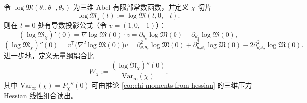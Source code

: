 \begin{corollary}\label{cor:chi-slice-logm-derivatives-and-W}
令 \(\log\mathfrak{M}(\theta_e,\theta_-,\theta_2)\) 为三维 Abel 有限部常数函数，并定义 \(\chi\) 切片
$$
\log\mathfrak{M}_\chi(t):=\log\mathfrak{M}(t,0,-t).
$$
则在 \(t=0\) 处有导数投影公式（令 \(v=(1,0,-1)\)）：
$$
(\log\mathfrak{M}_\chi)'(0)
=\nabla\log\mathfrak{M}(0)\cdot v
=\partial_{\theta_e}\log\mathfrak{M}(0)-\partial_{\theta_2}\log\mathfrak{M}(0),
$$
$$
(\log\mathfrak{M}_\chi)''(0)
=v^{\mathsf T}\bigl(\nabla^2\log\mathfrak{M}(0)\bigr)v
=\partial_{\theta_e\theta_e}^2\log\mathfrak{M}(0)+\partial_{\theta_2\theta_2}^2\log\mathfrak{M}(0)-2\partial_{\theta_e\theta_2}^2\log\mathfrak{M}(0).
$$
进一步地，定义无量纲耦合比
$$
W_\chi:=\frac{(\log\mathfrak{M}_\chi)''(0)}{\mathrm{Var}_\infty(\chi)}.
$$
其中 \(\mathrm{Var}_\infty(\chi)=P_\chi''(0)\) 可由推论 \ref{cor:chi-moments-from-hessian} 的三维压力 Hessian 线性组合读出。
\end{corollary}


